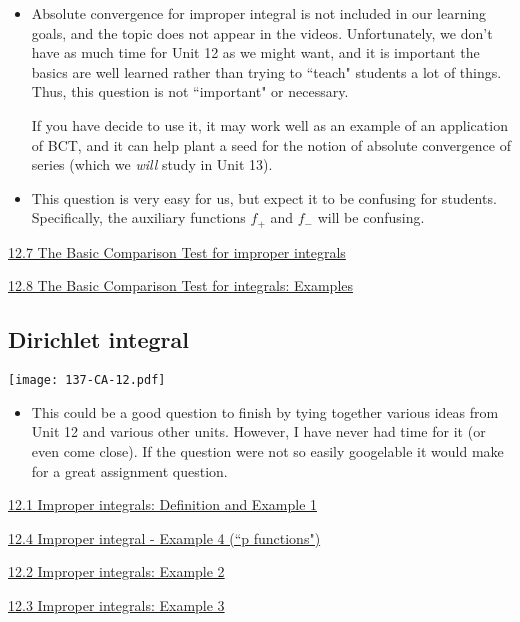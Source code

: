 \documentclass[11pt]{article}
\newcommand{\nl}{\hfill \vspace{-1.1\baselineskip}} %
\newcommand{\vi}{\hspace{8mm} \href{https://www.youtube.com/watch?v=NqxwJ2D-Ckc&list=PLlwePzQY_wW-OVbBuwbFDl8RB5kt2Tngo}{12.1 Improper integrals: Definition and Example 1}}
\newcommand{\vii}{\hspace{8mm} \href{https://www.youtube.com/watch?v=L9wxtktioik&list=PLlwePzQY_wW-OVbBuwbFDl8RB5kt2Tngo&index=2}{12.2 Improper integrals: Example 2}}
\newcommand{\viii}{\hspace{8mm} \href{https://www.youtube.com/watch?v=pbr8GWBmLhU&list=PLlwePzQY_wW-OVbBuwbFDl8RB5kt2Tngo&index=3}{12.3 Improper integrals: Example 3}}
\newcommand{\viv}{\hspace{8mm} \href{https://www.youtube.com/watch?v=LVKdfkNyp58&list=PLlwePzQY_wW-OVbBuwbFDl8RB5kt2Tngo&index=4}{12.4 Improper integral - Example 4 (``p functions")
}}
\newcommand{\vvii}{\hspace{8mm} \href{https://www.youtube.com/watch?v=8xtCdrLzQpQ&list=PLlwePzQY_wW-OVbBuwbFDl8RB5kt2Tngo&index=7}{12.7 The Basic Comparison Test for improper integrals}}
\newcommand{\vviii}{\hspace{8mm} \href{https://www.youtube.com/watch?v=9NeR7QXGJbE&list=PLlwePzQY_wW-OVbBuwbFDl8RB5kt2Tngo&index=8}{12.8 The Basic Comparison Test for integrals: Examples}}
\begin{document}
\begin{comments}
\nl
	\begin{itemize}
		\item Absolute convergence for improper integral is not included in our learning goals, and the topic does not appear in the videos.   Unfortunately, we don't have as much time for Unit 12 as we might want, and it is important the basics are well learned rather than trying to ``teach" students a lot of things.    Thus, this question is not ``important" or necessary.
		
		If you have decide to use it, it may work well as an example of an application of BCT, and it can help plant a seed for the notion of absolute convergence of series (which we \emph{will} study in Unit 13).
		
		\item This question is very easy for us, but expect it to be confusing for students.  Specifically, the auxiliary functions $f_+$ and $f_-$ will be confusing.
	\end{itemize}
\end{comments}

\begin{videos}
\vvii

\vviii
\end{videos}

\newpage
\subsection{Dirichlet integral}

\begin{center}
{ \texttt{[image: 137-CA-12.pdf]}} 
\end{center}

\begin{comments}
\nl
	\begin{itemize}
		\item This could be a good question to finish by tying together various ideas from Unit 12 and various other units.  However, I have never had time for it (or even come close).  If the question were not so easily googelable it would make for a great assignment question.
	\end{itemize}
\end{comments}

\begin{videos}
\vi

\viv

\vii

\viii
\end{videos}

\newpage
\end{document}
